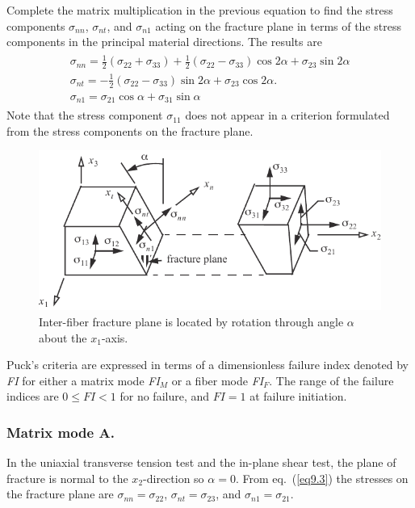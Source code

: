\documentclass{AeroStructure-ERJohnson}
\begin{document}
\noindent Complete the matrix multiplication in the previous equation to find the stress components $\sigma_\textit{nn}$, $\sigma_\textit{nt}$, and $\sigma_{n1}$ acting on the fracture plane in terms of the stress components in the principal material directions. The results are
\begin{align}\label{eq9.3}
\begin{gathered}\sigma_{n n}=\frac{1}{2}\left(\sigma_{22}+\sigma_{33}\right)+\frac{1}{2}\left(\sigma_{22}-\sigma_{33}\right) \cos 2 \alpha+\sigma_{23} \sin 2 \alpha \\\sigma_{n t}=-\frac{1}{2}\left(\sigma_{22}-\sigma_{33}\right) \sin 2 \alpha+\sigma_{23} \cos 2 \alpha. \\\sigma_{n 1}=\sigma_{21} \cos \alpha+\sigma_{31} \sin \alpha\end{gathered}
\end{align}
Note that the stress component $\sigma_\textit{11}$ does not appear in a criterion formulated from the stress components on the fracture plane.

\begin{figure}[!h]
\centerline{\includegraphics{Figure_9-1.pdf}}
\caption{Inter-fiber fracture plane is located by rotation through angle $\alpha$ about the $x_1$-axis. \label{fig9.1}}
\end{figure}

Puck's criteria are expressed in terms of a dimensionless failure index denoted by \textit{FI} for either a matrix mode \textit{FI}$_M$ or a fiber mode \textit{FI}$_F$. The range of the failure indices are $0 \leq F I<1$ for no failure, and $F I=1$ at failure initiation.


\subsubsection{Matrix mode A.}\quad In the uniaxial transverse tension test and the in-plane shear test, the plane of fracture is normal to the $x_2$-direction so $\alpha= 0$. From eq.~(\ref{eq9.3}) the stresses on the fracture plane are $\sigma_\textit{nn} = \sigma_\textit{22}$, $\sigma_\textit{nt} = \sigma_{23}$, and $\sigma_{n1} = \sigma_\textit{21}$.{\parfillskip=0pt\par}
\end{document}
